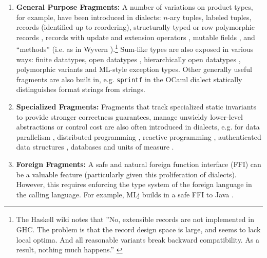 \begin{enumerate}
\item 
\textbf{General Purpose Fragments:} 
A number of variations on product types, for example, have been introduced in dialects: 
$n$-ary tuples, 
labeled tuples, 
records (identified up to reordering), 
structurally typed or row polymorphic records \cite{Cardelli:1984:SMI:1096.1098}, 
records with update and extension operators \cite{ocaml-manual}, 
mutable fields \cite{ocaml-manual}, 
and 
``methods'' (i.e. as in Wyvern \cite{conf/oopsla/Aldrich13, TSLs}).\footnote{The Haskell wiki notes that ''No, extensible records are not implemented in GHC. The problem is that the record design space is large, and seems to lack local optima. And all reasonable variants break backward compatibility. As a result, nothing much happens.'' \cite{GHCFAQ}} 
 Sum-like types are also exposed in various ways: 
finite datatypes, 
open datatypes \cite{conf/ppdp/LohH06}, 
hierarchically open datatypes \cite{journals/toplas/MillsteinBC04}, 
polymorphic variants \cite{ocaml-manual} and 
ML-style exception types. Other generally useful fragments are also built in, e.g. \verb|sprintf| in the OCaml dialect statically distinguishes format strings from strings.

\item
\textbf{Specialized Fragments:} Fragments that track specialized static invariants to provide stronger correctness guarantees, manage unwieldy lower-level abstractions or control cost are also often introduced in dialects, e.g. for data parallelism  \cite{chakravarty2007data}, distributed programming \cite{Murphy:2007:TDP:1793574.1793585}, reactive programming \cite{mandel2005reactiveml}, authenticated data structures \cite{Miller:2014:ADS:2535838.2535851}, databases \cite{Ohori:2011:MSM:2034773.2034815} and units of measure \cite{conf/cefp/Kennedy09}.%

\item
\textbf{Foreign Fragments:} A safe and natural foreign function interface (FFI) can be a valuable feature (particularly given this proliferation of dialects). However, this requires enforcing the type system of the foreign language in the calling language. %
For example, MLj builds in a safe FFI to Java \cite{Benton:1999:IWW:317636.317791}.
\end{enumerate}
\vspace{-5px}


